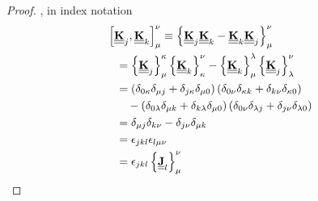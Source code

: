 \begin{proof}
, in index notation
\begin{align*}
\left[\MM{K}_j, \MM{K}_k\right]_\irow^\icol 
    & \equiv \left\{ \MM{K}_j \MM{K}_k - \MM{K}_k \MM{K}_j \right\}_\irow^\icol \\
    & \hspace{-4em} = \left\{\MM{K}_j\right\}_\irow^\kappa \left\{\MM{K}_k\right\}_\kappa^\icol 
      - \left\{\MM{K}_k\right\}_\irow^\lambda \left\{\MM{K}_j\right\}_\lambda^\icol \\
    & \hspace{-4em} = \left( \delta_{0\kappa}\delta_{\irow j} + \delta_{j\kappa} \delta_{\irow 0} \right) \left( \delta_{0\icol}\delta_{\kappa k} + \delta_{k\icol} \delta_{\kappa 0} \right) \\
    & \hspace{-3em} - \left( \delta_{0\lambda}\delta_{\irow k} + \delta_{k\lambda} \delta_{\irow 0} \right) \left( \delta_{0\icol}\delta_{\lambda j} + \delta_{j\icol} \delta_{\lambda 0} \right) \\
%
%
%
%
    & \hspace{-4em} = \delta_{\irow j}\delta_{k\icol} - \delta_{j\icol}\delta_{\irow k}  \\           
    & \hspace{-4em} = \epsilon_{jkl}  \epsilon_{l \irow\icol}   \\           
   & \hspace{-4em} = \epsilon_{jkl} \left\{ \MM{J}_l \right\}_\irow^\icol
\end{align*}
\end{proof}

